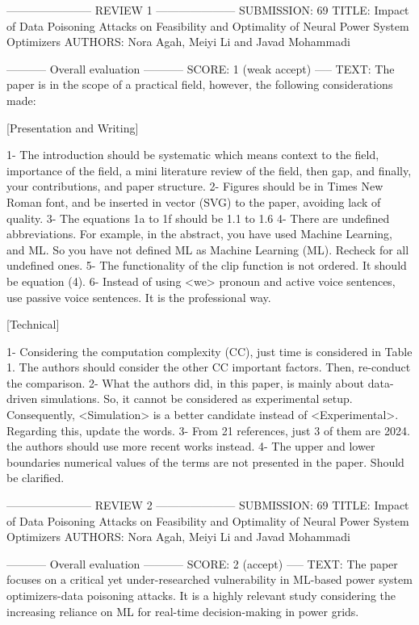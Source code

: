 
----------------------- REVIEW 1 ---------------------
SUBMISSION: 69
TITLE: Impact of Data Poisoning Attacks on Feasibility and Optimality of Neural Power System Optimizers
AUTHORS: Nora Agah, Meiyi Li and Javad Mohammadi

----------- Overall evaluation -----------
SCORE: 1 (weak accept)
----- TEXT:
The paper is in the scope of a practical field, however, the following considerations made:

[Presentation and Writing]

1- The introduction should be systematic which means context to the field, importance of the field, a mini literature review of the field, then gap, and finally, your contributions, and paper structure.
2- Figures should be in Times New Roman font, and be inserted in vector (SVG) to the paper, avoiding lack of quality.
3- The equations 1a to 1f should be 1.1 to 1.6
4- There are undefined abbreviations. For example, in the abstract, you have used Machine Learning, and ML. So you have not defined ML as Machine Learning (ML). Recheck for all undefined ones.
5- The functionality of the clip function is not ordered. It should be equation (4).
6- Instead of using <we> pronoun and active voice sentences, use passive voice sentences. It is the professional way.

[Technical]

1- Considering the computation complexity (CC), just time is considered in Table 1. The authors should consider the other CC important factors. Then, re-conduct the comparison.
2- What the authors did, in this paper, is mainly about data-driven simulations. So, it cannot be considered as experimental setup. Consequently, <Simulation> is a better candidate instead of <Experimental>. Regarding this, update the words.
3- From 21 references, just 3 of them are 2024. the authors should use more recent works instead.
4- The upper and lower boundaries numerical values of the terms are not presented in the paper. Should be clarified.



----------------------- REVIEW 2 ---------------------
SUBMISSION: 69
TITLE: Impact of Data Poisoning Attacks on Feasibility and Optimality of Neural Power System Optimizers
AUTHORS: Nora Agah, Meiyi Li and Javad Mohammadi

----------- Overall evaluation -----------
SCORE: 2 (accept)
----- TEXT:
The paper focuses on a critical yet under-researched vulnerability in ML-based power system optimizers-data poisoning attacks. It is a highly relevant study considering the increasing reliance on ML for real-time decision-making in power grids.

